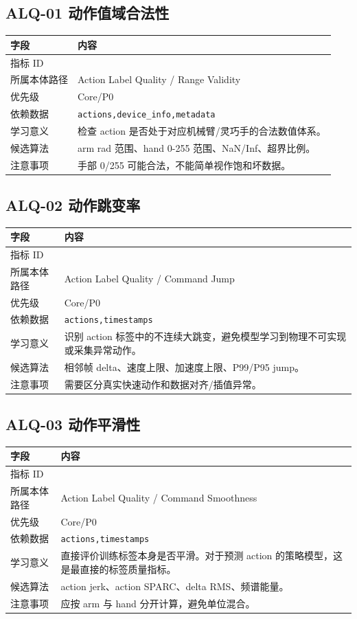 \documentclass[UTF8,zihao=-4,oneside,openany]{ctexrep}
\newcommand{\Code}[1]{\texttt{#1}}
\newcommand{\MID}[1]{\texttt{\seqsplit{#1}}}
\begin{document}
\subsection{ALQ-01 动作值域合法性}

\begin{longtable}{L{3.6cm} L{9.6cm}}
\toprule
字段 & 内容 \\
\midrule
指标 ID & \MID{ALQ-01} \\
所属本体路径 & Action Label Quality / Range Validity \\
优先级 & Core/P0 \\
依赖数据 & \Code{actions,device\_info,metadata} \\
学习意义 & 检查 action 是否处于对应机械臂/灵巧手的合法数值体系。 \\
候选算法 & arm rad 范围、hand 0-255 范围、NaN/Inf、超界比例。 \\
注意事项 & 手部 0/255 可能合法，不能简单视作饱和坏数据。 \\
\bottomrule
\end{longtable}

\subsection{ALQ-02 动作跳变率}

\begin{longtable}{L{3.6cm} L{9.6cm}}
\toprule
字段 & 内容 \\
\midrule
指标 ID & \MID{ALQ-02} \\
所属本体路径 & Action Label Quality / Command Jump \\
优先级 & Core/P0 \\
依赖数据 & \Code{actions,timestamps} \\
学习意义 & 识别 action 标签中的不连续大跳变，避免模型学习到物理不可实现或采集异常动作。 \\
候选算法 & 相邻帧 delta、速度上限、加速度上限、P99/P95 jump。 \\
注意事项 & 需要区分真实快速动作和数据对齐/插值异常。 \\
\bottomrule
\end{longtable}

\subsection{ALQ-03 动作平滑性}

\begin{longtable}{L{3.6cm} L{9.6cm}}
\toprule
字段 & 内容 \\
\midrule
指标 ID & \MID{ALQ-03} \\
所属本体路径 & Action Label Quality / Command Smoothness \\
优先级 & Core/P0 \\
依赖数据 & \Code{actions,timestamps} \\
学习意义 & 直接评价训练标签本身是否平滑。对于预测 action 的策略模型，这是最直接的标签质量指标。 \\
候选算法 & action jerk、action SPARC、delta RMS、频谱能量。 \\
注意事项 & 应按 arm 与 hand 分开计算，避免单位混合。 \\
\bottomrule
\end{longtable}
\end{document}
